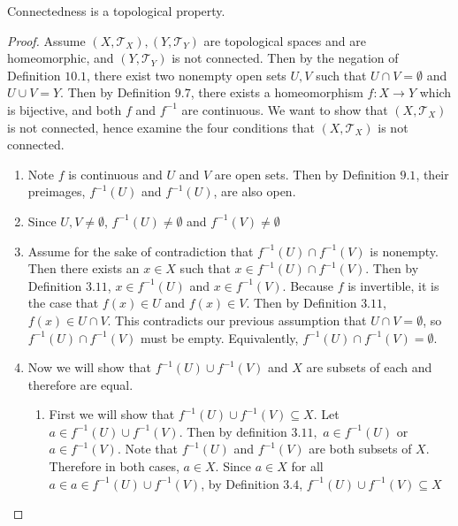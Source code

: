 \documentclass[12pt,titlepage]{extarticle}
\begin{document}
\begin{theorem}
Connectedness is a topological property.
\end{theorem}

\begin{proof}
Assume $(X,\mathcal{T}_X),(Y,\mathcal{T}_Y)$ are topological spaces and are homeomorphic, and $(Y,\mathcal{T}_Y)$ is 
not connected. Then by the negation of Definition $10.1$, there exist two nonempty open sets $U,V$ such that $U\cap V=\emptyset$ and $U\cup V=Y$. Then by Definition $9.7$, there exists a homeomorphism $f:X\to Y$ which is bijective, and both $f$ and $f^{-1}$ are continuous. We want to show that $(X,\mathcal{T}_X)$ is not connected, hence examine the four conditions that $(X, \mathcal{T}_X)$ is not connected.

\begin{enumerate}
    \item %
    Note $f$ is continuous and $U$ and $V$ are open sets. Then by Definition $9.1$, their preimages, $f^{-1}(U)$ and $f^{-1}(U)$, are also open. 
    \item %
    Since $U,V\neq\emptyset$, $f^{-1}(U)\neq\emptyset$ and $f^{-1}(V)\neq\emptyset$
    \item %
    Assume for the sake of contradiction that $f^{-1}(U)\cap f^{-1}(V)$ is nonempty. Then there exists an $x\in X$ such that $x\in f^{-1}(U)\cap f^{-1}(V)$. Then by Definition $3.11$, $x\in f^{-1}(U)$ and $x\in f^{-1}(V)$. Because $f$ is invertible, it is the case that $f(x)\in U$ and $f(x)\in V$. Then by Definition $3.11$, $f(x)\in U\cap V$. This contradicts our previous assumption that $U\cap V=\emptyset$, so $f^{-1}(U)\cap f^{-1}(V)$ must be empty. Equivalently, $f^{-1}(U)\cap f^{-1}(V)=\emptyset$. 
    \item %
    Now we will show that $f^{-1}(U)\cup f^{-1}(V)$ and $X$ are subsets of each and therefore are equal.
    \begin{enumerate}[label=\alph*)]
        \item First we will show that $f^{-1}(U)\cup f^{-1}(V) \subseteq X$. Let $a\in f^{-1}(U)\cup f^{-1}(V)$. Then by definition $3.11,$ $a\in f^{-1}(U)$ or $a\in f^{-1}(V)$. Note that $f^{-1}(U)$ and $f^{-1}(V)$ are both subsets of $X$. Therefore in both cases, $a\in X$. Since $a\in X$ for all $a\in a\in f^{-1}(U)\cup f^{-1}(V)$, by Definition $3.4$, $f^{-1}(U)\cup f^{-1}(V)\subseteq X$

\end{enumerate}
\end{enumerate}
\end{proof}
\end{document}
